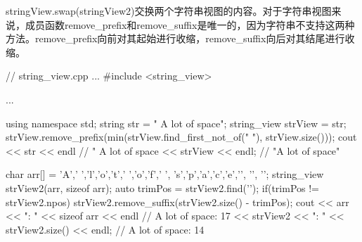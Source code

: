 stringView.swap(stringView2)交换两个字符串视图的内容。对于字符串视图来说，成员函数remove\_prefix和remove\_suffix是唯一的，因为字符串不支持这两种方法。remove\_prefix向前对其起始进行收缩，remove\_suffix向后对其结尾进行收缩。


\begin{cpp}
// string_view.cpp
...
#include <string_view>

...

using namespace std;
string str = " A lot of space";
string_view strView = str;
strView.remove_prefix(min(strView.find_first_not_of(" "), strView.size()));
cout << str << endl // " A lot of space
	 << strView << endl; // "A lot of space"
	 
char arr[] = {'A',' ','l','o','t',' ','o','f',' ',
			  's','p','a','c','e','\0', '\0', '\0'};
string_view strView2(arr, sizeof arr);
auto trimPos = strView2.find('\0');
if(trimPos != strView2.npos) strView2.remove_suffix(strView2.size() - trimPos);
cout << arr << ": " << sizeof arr << endl // A lot of space: 17
	 << strView2 << ": " << strView2.size() << endl; // A lot of space: 14
\end{cpp}

